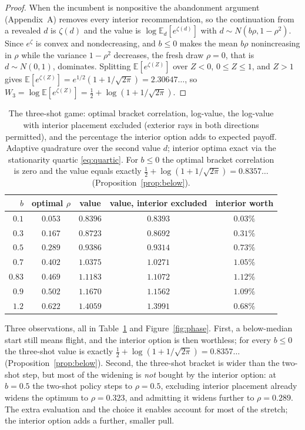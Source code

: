 \documentclass[11pt]{article}
\theoremstyle{itheads}
\newcommand{\E}{\mathbb{E}}
\begin{document}
\begin{proof}
When the incumbent is nonpositive the abandonment argument
(Appendix~A) removes every interior recommendation, so the
continuation from a revealed $d$ is $\zeta(d)$ and the value is
$\log\E_d\!\left[e^{\zeta(d)}\right]$ with
$d\sim N\!\left(b\rho,1-\rho^{2}\right)$. Since $e^{\zeta}$ is
convex and nondecreasing, and $b\le 0$ makes the mean $b\rho$
nonincreasing in $\rho$ while the variance $1-\rho^{2}$ decreases,
the fresh draw $\rho=0$, that is $d\sim N(0,1)$, dominates. Splitting
$\E\!\left[e^{\zeta(Z)}\right]$ over $Z<0$, $0\le Z\le 1$, and
$Z>1$ gives $\E\!\left[e^{\zeta(Z)}\right]=e^{1/2}\!\left(1+1/\sqrt{2\pi}\right)=2.30647\ldots$,
so $W_3=\log\E\!\left[e^{\zeta(Z)}\right]=\tfrac12+\log\!\left(1+1/\sqrt{2\pi}\right)$.
\end{proof}

\begin{table}[t]
\centering
\begin{tabular}{rcccc}
\toprule
$b$ & optimal $\rho$ & value & value, interior excluded & interior worth \\
\midrule
$0.1$ & $0.053$ & $0.8396$ & $0.8393$ & $0.03\%$ \\
$0.3$ & $0.167$ & $0.8723$ & $0.8692$ & $0.31\%$ \\
$0.5$ & $0.289$ & $0.9386$ & $0.9314$ & $0.73\%$ \\
$0.7$ & $0.402$ & $1.0375$ & $1.0271$ & $1.05\%$ \\
$0.83$ & $0.469$ & $1.1183$ & $1.1072$ & $1.12\%$ \\
$0.9$ & $0.502$ & $1.1670$ & $1.1562$ & $1.09\%$ \\
$1.2$ & $0.622$ & $1.4059$ & $1.3991$ & $0.68\%$ \\
\bottomrule
\end{tabular}
\caption{The three-shot game: optimal bracket correlation, log-value,
the log-value with interior placement excluded (exterior rays in both
directions permitted), and the percentage the interior option adds to
expected payoff. Adaptive quadrature over the second value $d$;
interior optima exact via the stationarity quartic
\eqref{eq:quartic}. For $b\le0$ the optimal bracket correlation is
zero and the value equals exactly
$\tfrac12+\log\!\left(1+1/\sqrt{2\pi}\right)=0.8357\ldots$
(Proposition~\ref{prop:below}).}
\label{tab:threeshot}
\end{table}

Three observations, all in Table~\ref{tab:threeshot} and
Figure~\ref{fig:phase}. First, a below-median start still means
flight, and the interior option is then worthless; for every
$b\le0$ the three-shot value is exactly
$\tfrac12+\log(1+1/\sqrt{2\pi})=0.8357\ldots$
(Proposition~\ref{prop:below}). Second, the
three-shot bracket is wider than the two-shot step, but most of the
widening is \emph{not} bought by the interior option: at $b=0.5$ the
two-shot policy steps to $\rho=0.5$, excluding interior placement
already widens the optimum to $\rho=0.323$, and admitting it widens
further to $\rho=0.289$. The extra evaluation and the choice it
enables account for most of the stretch; the interior option adds a
further, smaller pull.
\end{document}
